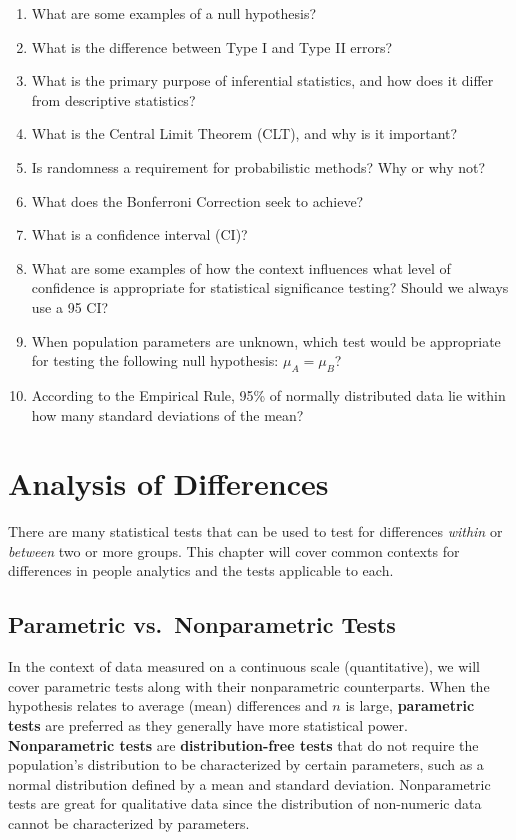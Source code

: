 \documentclass[
]{book}
\begin{document}
\begin{enumerate}
\def\labelenumi{\arabic{enumi}.}
\item
  What are some examples of a null hypothesis?
\item
  What is the difference between Type I and Type II errors?
\item
  What is the primary purpose of inferential statistics, and how does it differ from descriptive statistics?
\item
  What is the Central Limit Theorem (CLT), and why is it important?
\item
  Is randomness a requirement for probabilistic methods? Why or why not?
\item
  What does the Bonferroni Correction seek to achieve?
\item
  What is a confidence interval (CI)?
\item
  What are some examples of how the context influences what level of confidence is appropriate for statistical significance testing? Should we always use a 95 CI?
\item
  When population parameters are unknown, which test would be appropriate for testing the following null hypothesis: \(\mu_A = \mu_B\)?
\item
  According to the Empirical Rule, 95\% of normally distributed data lie within how many standard deviations of the mean?
\end{enumerate}

\hypertarget{aod}{%
\chapter{Analysis of Differences}\label{aod}}

There are many statistical tests that can be used to test for differences \emph{within} or \emph{between} two or more groups. This chapter will cover common contexts for differences in people analytics and the tests applicable to each.

\hypertarget{parametric-vs.-nonparametric-tests}{%
\section{Parametric vs.~Nonparametric Tests}\label{parametric-vs.-nonparametric-tests}}

In the context of data measured on a continuous scale (quantitative), we will cover parametric tests along with their nonparametric counterparts. When the hypothesis relates to average (mean) differences and \(n\) is large, \textbf{parametric tests} are preferred as they generally have more statistical power. \textbf{Nonparametric tests} are \textbf{distribution-free tests} that do not require the population's distribution to be characterized by certain parameters, such as a normal distribution defined by a mean and standard deviation. Nonparametric tests are great for qualitative data since the distribution of non-numeric data cannot be characterized by parameters.
\end{document}
